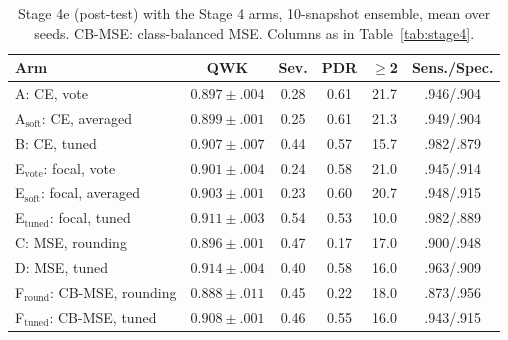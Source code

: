 \begin{table}[t]
\centering
\caption{Stage 4e (post-test) with the Stage 4 arms, 10-snapshot ensemble, mean over seeds. CB-MSE: class-balanced MSE. Columns as in Table~\ref{tab:stage4}.}
\label{tab:stage4e}
\footnotesize
\setlength{\tabcolsep}{2.5pt}
\begin{tabular}{@{}lccccc@{}}
\toprule
Arm & QWK & Sev. & PDR & $\ge$2 & Sens./Spec. \\
\midrule
A: CE, vote & $0.897\pm.004$ & 0.28 & 0.61 & 21.7 & .946/.904 \\
A$_\text{soft}$: CE, averaged & $0.899\pm.001$ & 0.25 & 0.61 & 21.3 & .949/.904 \\
B: CE, tuned & $0.907\pm.007$ & 0.44 & 0.57 & 15.7 & .982/.879 \\
\midrule
E$_\text{vote}$: focal, vote & $0.901\pm.004$ & 0.24 & 0.58 & 21.0 & .945/.914 \\
E$_\text{soft}$: focal, averaged & $0.903\pm.001$ & 0.23 & 0.60 & 20.7 & .948/.915 \\
E$_\text{tuned}$: focal, tuned & $0.911\pm.003$ & 0.54 & 0.53 & 10.0 & .982/.889 \\
\midrule
C: MSE, rounding & $0.896\pm.001$ & 0.47 & 0.17 & 17.0 & .900/.948 \\
D: MSE, tuned & $0.914\pm.004$ & 0.40 & 0.58 & 16.0 & .963/.909 \\
\midrule
F$_\text{round}$: CB-MSE, rounding & $0.888\pm.011$ & 0.45 & 0.22 & 18.0 & .873/.956 \\
F$_\text{tuned}$: CB-MSE, tuned & $0.908\pm.001$ & 0.46 & 0.55 & 16.0 & .943/.915 \\
\bottomrule
\end{tabular}
\end{table}
